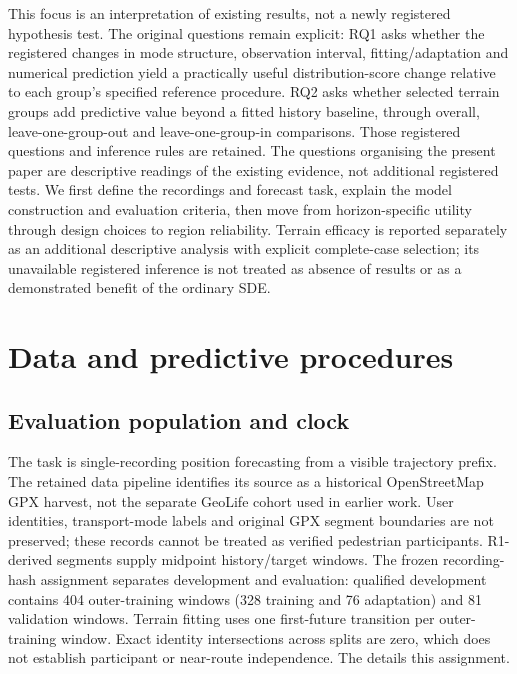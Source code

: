 This focus is an interpretation of existing results, not a newly
registered hypothesis test. The original questions remain explicit:
RQ1 asks whether the registered changes in mode structure, observation
interval, fitting/adaptation and numerical prediction yield a practically
useful distribution-score change relative to each group's specified reference procedure. RQ2 asks
whether selected terrain groups add predictive value beyond a fitted
history baseline, through overall, leave-one-group-out and leave-one-group-in
comparisons. Those registered questions and inference rules are retained.
The questions organising the present paper are descriptive readings
of the existing evidence, not additional registered tests. We first define
the recordings and forecast task, explain the model construction and
evaluation criteria, then move from horizon-specific utility through design
choices to region reliability. Terrain efficacy is reported separately as
an additional descriptive analysis with explicit complete-case selection;
its unavailable registered inference is not treated as absence of results
or as a demonstrated benefit of the ordinary SDE.

\section{Data and predictive procedures}\label{sec:data}\hypertarget{sec:protocol}{}

\subsection{Evaluation population and clock}
The task is single-recording position forecasting from a visible trajectory
prefix. The retained data pipeline identifies its source as a historical
OpenStreetMap GPX harvest, not the separate GeoLife cohort used in earlier
work. User identities, transport-mode labels and original GPX segment
boundaries are not preserved; these records cannot be treated as verified
pedestrian participants. R1-derived segments supply midpoint history/target
windows. The frozen recording-hash assignment separates development and
evaluation: qualified development contains 404 outer-training windows
(328 training and 76 adaptation) and 81 validation windows. Terrain fitting
uses one first-future transition per outer-training window. Exact identity
intersections across splits are zero, which does not establish participant
or near-route independence. The  details this assignment.

